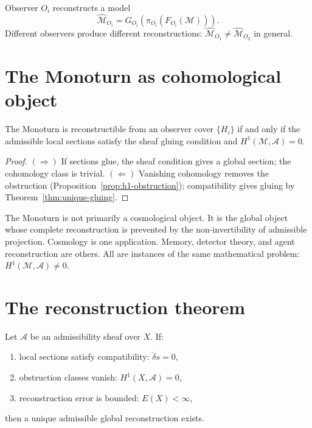 \begin{definition}
  Observer $O_i$ reconstructs a model
  \[
    \widehat{\mathcal{M}}_{O_i}
    = G_{O_i}(\pi_{O_i}(F_{O_i}(\mathcal{M}))).
  \]
  Different observers produce different reconstructions:
  $\widehat{\mathcal{M}}_{O_1} \neq \widehat{\mathcal{M}}_{O_2}$
  in general.
\end{definition}

\section{The Monoturn as cohomological object}

\begin{theorem}
  \label{thm:monoturn-recon}
  \statusproven{}
  The Monoturn is reconstructible from an observer cover
  $\{H_i\}$ if and only if the admissible local sections
  satisfy the sheaf gluing condition and
  $H^1(\mathcal{M}, \mathcal{A}) = 0$.
\end{theorem}

\begin{proof}
  $(\Rightarrow)$ If sections glue, the sheaf condition gives
  a global section; the cohomology class is trivial.
  $(\Leftarrow)$ Vanishing cohomology removes the obstruction
  (Proposition~\ref{prop:h1-obstruction});
  compatibility gives gluing by Theorem~\ref{thm:unique-gluing}.
\end{proof}


\begin{InterpBox}
  The Monoturn is not primarily a cosmological object.
  It is the global object whose complete reconstruction is
  prevented by the non-invertibility of admissible projection.
  Cosmology is one application.
  Memory, detector theory, and agent reconstruction are others.
  All are instances of the same mathematical problem:
  $H^1(\mathcal{M}, \mathcal{A}) \neq 0$.
\end{InterpBox}

\section{The reconstruction theorem}

\begin{theorem}
  \label{thm:holonomic-recon}
  \statusproven{}
  Let $\mathcal{A}$ be an admissibility sheaf over $X$.
  If:
  \begin{enumerate}[leftmargin=2em]
    \item local sections satisfy compatibility:
      $\check{\delta}s = 0$,
    \item obstruction classes vanish:
      $H^1(X, \mathcal{A}) = 0$,
    \item reconstruction error is bounded:
      $E(X) < \infty$,
  \end{enumerate}
  then a unique admissible global reconstruction exists.
\end{theorem}

